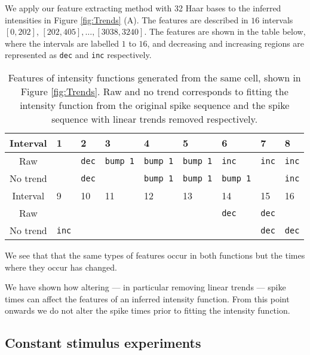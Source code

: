 \documentclass[12pt]{book} %
\begin{document}
  We apply our feature extracting method with 32 Haar bases to the inferred intensities in Figure \ref{fig:Trends} (A). The features are described in $16$ intervals $[0,202]$, $[202,405], \dots, [3038,3240]$. The features are shown in the table below, where the intervals are labelled $1$ to $16$, and decreasing and increasing regions are represented as {\tt dec} and {\tt inc} respectively.
 
 \begin{table}[h!]
  \begin{center}
    \label{table:Haar}
    \begin{tabular}{|c|l|l|l|l|l|l|l|l|}
    \hline
      Interval & 1 & 2 & 3 & 4 & 5 & 6 & 7 & 8 
        \\ 
      \hline
      Raw &  & {\tt dec} & {\tt bump 1} & {\tt bump 1} & {\tt bump 1} & {\tt inc} & {\tt inc} & {\tt inc}   \\
     No trend & & {\tt dec} &  &{\tt  bump 1} & {\tt bump 1} & {\tt bump 1} &  & {\tt inc}  \\ \hline
     \hline
 	Interval & 9 & 10 & 11 & 12 & 13 & 14 & 15 & 16 \\ \hline
 	  Raw   & &  &  &  &  & {\tt dec} & {\tt dec} &   \\
     No trend & {\tt inc} &  &  &  & & & {\tt dec} & {\tt dec}  \\ \hline
    \end{tabular}
    \label{table:feat_with/out_trend}
    \caption{Features of intensity functions generated from the same cell, shown in Figure \ref{fig:Trends}. Raw and no trend corresponds to fitting the intensity function from the original  spike sequence and the spike sequence with linear trends removed respectively.  }
  \end{center}
\end{table} 
We see that that the same types of features occur in both functions but the times where they occur has changed.

We have shown how altering --- in particular removing linear trends ---  spike times  can affect the features of an inferred intensity function. From this point onwards we do not alter the  spike times prior to fitting the intensity function.


\subsection{Constant stimulus experiments}
\end{document}
